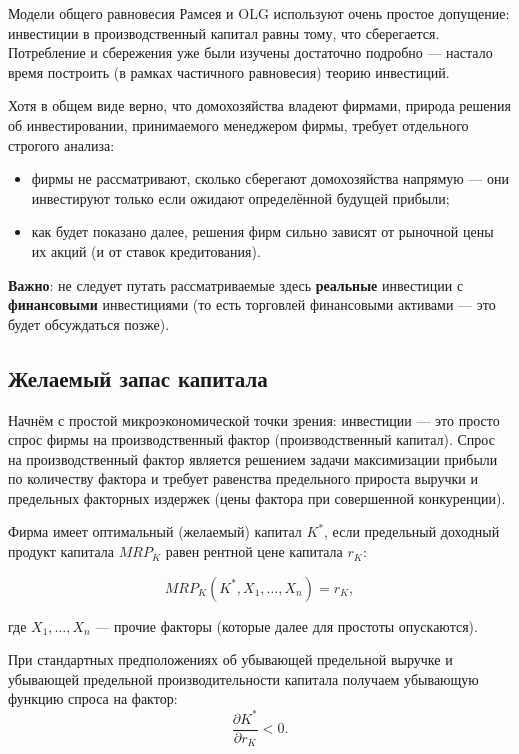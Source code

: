 \documentclass[10pt,a4paper]{article}
\begin{document}
Модели общего равновесия Рамсея и OLG используют очень простое допущение: инвестиции в производственный капитал равны тому, что сберегается. Потребление и сбережения уже были изучены достаточно подробно — настало время построить (в рамках частичного равновесия) теорию инвестиций.

Хотя в общем виде верно, что домохозяйства владеют фирмами, природа решения об инвестировании, принимаемого менеджером фирмы, требует отдельного строгого анализа:
\begin{itemize}[leftmargin=1.3em]
\item фирмы не рассматривают, сколько сберегают домохозяйства напрямую — они инвестируют только если ожидают определённой будущей прибыли;
\item как будет показано далее, решения фирм сильно зависят от рыночной цены их акций (и от ставок кредитования).
\end{itemize}

\textbf{Важно}: не следует путать рассматриваемые здесь \textbf{реальные} инвестиции с \textbf{финансовыми} инвестициями (то есть торговлей финансовыми активами — это будет обсуждаться позже).


\subsection{Желаемый запас капитала}

Начнём с простой микроэкономической точки зрения: инвестиции — это просто спрос фирмы на производственный фактор (производственный капитал). Спрос на производственный фактор является решением задачи максимизации прибыли по количеству фактора и требует равенства предельного прироста выручки и предельных факторных издержек (цены фактора при совершенной конкуренции).

Фирма имеет оптимальный (желаемый) капитал $K^{*}$, если предельный доходный продукт капитала $MRP_K$ равен рентной цене капитала $r_K$:
\begin{formulabox}
\begin{equation}
MRP_K(K^{*}, X_1,\dots,X_n) = r_K, \tag{8.1}
\end{equation}
\end{formulabox}
где $X_1,\dots,X_n$ — прочие факторы (которые далее для простоты опускаются).

При стандартных предположениях об убывающей предельной выручке и убывающей предельной производительности капитала получаем убывающую функцию спроса на фактор:
$$\frac{\partial K^{*}}{\partial r_K} < 0.$$
\end{document}
